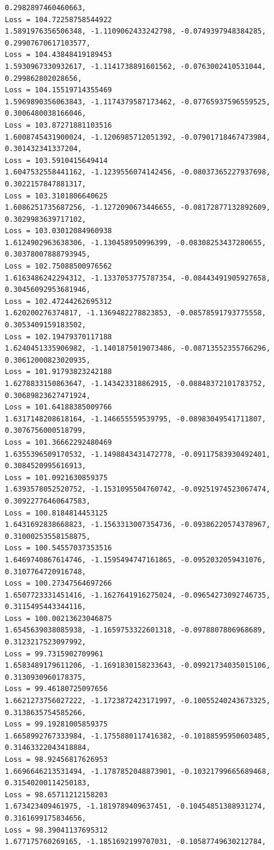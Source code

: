 \documentclass[11pt]{article}
\begin{document}
\begin{Verbatim}[commandchars=\\\{\}]
0.2982897460460663,
Loss = 104.72258758544922
1.5891976356506348, -1.1109062433242798, -0.0749397948384285,
0.29907670617103577,
Loss = 104.43848419189453
1.5930967330932617, -1.1141738891601562, -0.0763002410531044, 0.299862802028656,
Loss = 104.15519714355469
1.5969890356063843, -1.1174379587173462, -0.07765937596559525,
0.3006480038166046,
Loss = 103.87271881103516
1.6008745431900024, -1.1206985712051392, -0.07901718467473984,
0.301432341337204,
Loss = 103.5910415649414
1.6047532558441162, -1.1239556074142456, -0.08037365227937698,
0.3022157847881317,
Loss = 103.3101806640625
1.6086251735687256, -1.1272090673446655, -0.08172877132892609,
0.3029983639717102,
Loss = 103.03012084960938
1.6124902963638306, -1.130458950996399, -0.08308253437280655,
0.30378007888793945,
Loss = 102.75088500976562
1.6163486242294312, -1.1337053775787354, -0.08443491905927658,
0.30456092953681946,
Loss = 102.47244262695312
1.620200276374817, -1.1369482278823853, -0.08578591793775558,
0.3053409159183502,
Loss = 102.19479370117188
1.6240451335906982, -1.1401875019073486, -0.08713552355766296,
0.30612000823020935,
Loss = 101.91793823242188
1.6278833150863647, -1.143423318862915, -0.08848372101783752,
0.30689823627471924,
Loss = 101.64188385009766
1.6317148208618164, -1.146655559539795, -0.08983049541711807,
0.3076756000518799,
Loss = 101.36662292480469
1.6355396509170532, -1.1498843431472778, -0.09117583930492401,
0.3084520995616913,
Loss = 101.0921630859375
1.6393578052520752, -1.1531095504760742, -0.09251974523067474,
0.30922776460647583,
Loss = 100.8184814453125
1.6431692838668823, -1.1563313007354736, -0.09386220574378967,
0.31000253558158875,
Loss = 100.54557037353516
1.6469740867614746, -1.1595494747161865, -0.0952032059431076,
0.3107764720916748,
Loss = 100.27347564697266
1.6507723331451416, -1.1627641916275024, -0.09654273092746735,
0.3115495443344116,
Loss = 100.00213623046875
1.6545639038085938, -1.1659753322601318, -0.0978807806968689,
0.3123217523097992,
Loss = 99.7315902709961
1.6583489179611206, -1.1691830158233643, -0.09921734035015106,
0.3130930960178375,
Loss = 99.46180725097656
1.6621273756027222, -1.1723872423171997, -0.10055240243673325,
0.3138635754585266,
Loss = 99.19281005859375
1.6658992767333984, -1.1755880117416382, -0.10188595950603485,
0.31463322043418884,
Loss = 98.92456817626953
1.6696646213531494, -1.1787852048873901, -0.10321799665689468,
0.31540200114250183,
Loss = 98.65711212158203
1.673423409461975, -1.1819789409637451, -0.10454851388931274,
0.3161699175834656,
Loss = 98.39041137695312
1.677175760269165, -1.1851692199707031, -0.10587749630212784,

\end{Verbatim}
\end{document}
